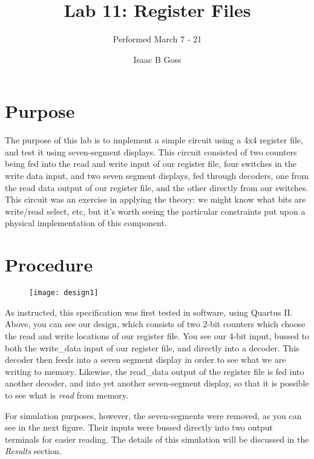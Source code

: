 \documentclass[titlepage]{article}
\author{Isaac B Goss}
\title{Lab 11: Register Files}
\subtitle{Performed March 7 - 21}
\begin{document}
    \maketitle
    \section{Purpose}
        The purpose of this lab is to implement a simple circuit using a 4x4 register file, and test it using seven-segment displays.
        This circuit consisted of two counters being fed into the read and write input of our register file, four switches in the write data input, and two seven segment displays, fed through decoders, one from the read data output of our register file, and the other directly from our switches.
        This circuit was an exercise in applying the theory: we might know what bits are write/read select, etc, but it's worth seeing the particular constraints put upon a physical implementation of this component.
        
    \section{Procedure}
    
        \begin{figure}[h]
        	\centering
        	\texttt{[image: design1]}
        \end{figure}
        
        As instructed, this specification was first tested in software, using Quartus II.
        Above, you can see our design, which consists of two 2-bit counters which choose the read and write locations of our register file.
        You see our 4-bit input, bussed to both the write_data input of our register file, and directly into a decoder.
        This decoder then feeds into a seven segment display in order to see what we are writing to memory.
        Likewise, the read_data output of the register file is fed into another decoder, and into yet another seven-segment display, so that it is possible to see what is \textit{read} from memory.
        
        For simulation purposes, however, the seven-segments were removed, as you can see in the next figure.  Their inputs were bussed directly into two output terminals for easier reading. 
        The details of this simulation will be discussed in the \textit{Results} section.
        
\end{document}
